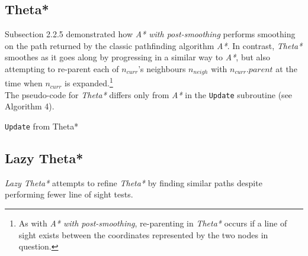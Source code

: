 \documentclass[12pt,notitlepage]{report}
\begin{document}
\subsection {Theta*}

Subsection 2.2.5 demonstrated how {\em A* with post-smoothing} performs smoothing on the path returned by the classic pathfinding algorithm {\em A*}. In contrast, {\em Theta*} smoothes as it goes along by progressing in a similar way to {\em A*}, but also attempting to re-parent each of $n_{curr}$'s neighbours $n_{neigh}$ with $n_{curr}.parent$ at the time when $n_{curr}$ is expanded.\footnote{As with {\em A* with post-smoothing}, re-parenting in {\em Theta*} occurs if a line of sight exists between the coordinates represented by the two nodes in question.}\\

\noindent
The pseudo-code for {\em Theta*} differs only from {\em A*} in the {\tt Update} subroutine (see Algorithm 4).

\begin{algorithm}
  \SetAlgoLined\DontPrintSemicolon
  \caption{{\tt Update} from {\sc Theta*}}
\end{algorithm} 

\subsection {Lazy Theta*}

{\em Lazy Theta*} attempts to refine {\em Theta*} by finding similar paths despite performing fewer line of sight tests.\\
\end{document}
